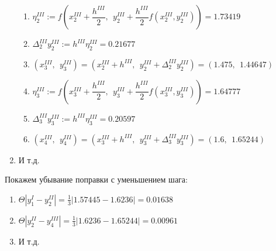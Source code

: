 \begin{enumerate}
\begin{enumerate}
        \item $\eta_2^{III} := f\left(x_2^{III}+\dfrac{h^{III}}{2},~~ y_2^{III}+\dfrac{h^{III}}{2}f(x_2^{III},y_2^{III})\right) = 1.73419$
        \item $\Delta_2^{III} y_2^{III} := h^{III}\eta_2^{III} = 0.21677$
        \item $(x_3^{III},~~ y_3^{III}) = (x_2^{III}+h^{III}, ~~y_2^{III} + \Delta_2^{III} y_2^{III}) = (1.475, ~~ 1.44647)$

        \item $\eta_3^{III} := f\left(x_3^{III}+\dfrac{h^{III}}{2},~~ y_3^{III}+\dfrac{h^{III}}{2}f(x_3^{III},y_3^{III})\right) = 1.64777$
        \item $\Delta_3^{III} y_3^{III} := h^{III}\eta_3^{III} = 0.20597$
        \item $(x_4^{III},~~ y_4^{III}) = (x_3^{III}+h^{III}, ~~y_3^{III} + \Delta_3^{III} y_3^{III}) = \mathbf{(1.6, ~~ 1.65244)}$
    \end{enumerate}

    \item И т.д.
\end{enumerate}

Покажем убывание поправки с уменьшением шага:
\begin{enumerate}
    \item $\Theta|y_1^{I} - y_2^{II}| = \frac{1}{3}|1.57445 - 1.6236| = \mathbf{0.01638}$

    \item $\Theta|y_2^{II} - y_4^{III}| = \frac{1}{3}|1.6236 - 1.65244| =\mathbf{0.00961}$

    \item И т.д.
\end{enumerate}
